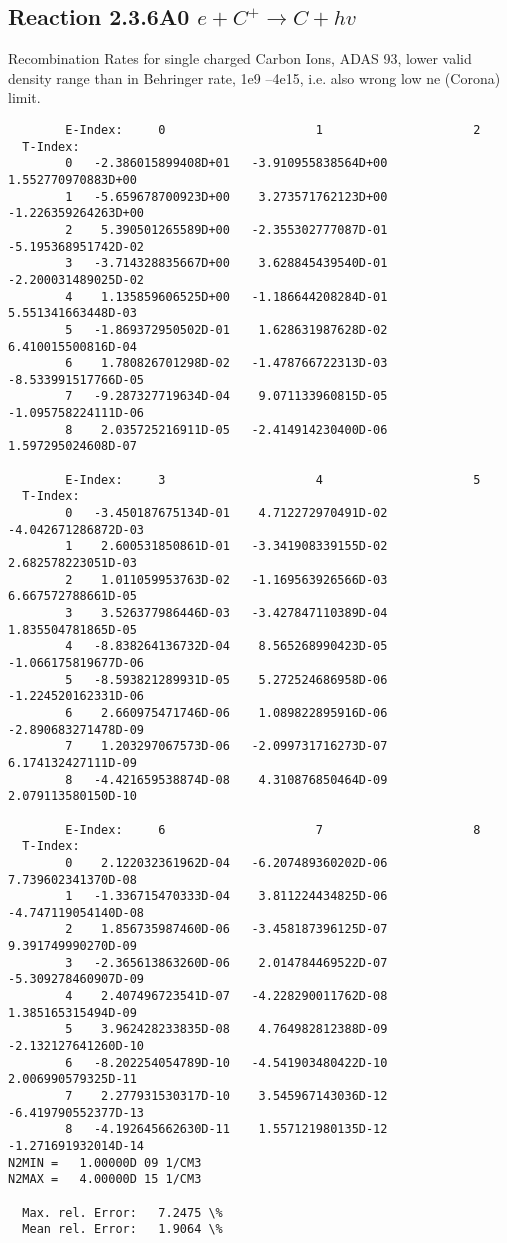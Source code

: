 \documentclass[12pt,dvipdfmx]{article}
\begin{document}
\subsection{
Reaction 2.3.6A0  $e + C^{+} \rightarrow C + hv$
}
 Recombination Rates for single
 charged Carbon Ions, ADAS 93,
 lower valid density range than in Behringer rate, 1e9 --4e15,
 i.e. also wrong low ne (Corona) limit.

\begin{small}\begin{verbatim}
        E-Index:     0                     1                     2
  T-Index:
        0   -2.386015899408D+01   -3.910955838564D+00    1.552770970883D+00
        1   -5.659678700923D+00    3.273571762123D+00   -1.226359264263D+00
        2    5.390501265589D+00   -2.355302777087D-01   -5.195368951742D-02
        3   -3.714328835667D+00    3.628845439540D-01   -2.200031489025D-02
        4    1.135859606525D+00   -1.186644208284D-01    5.551341663448D-03
        5   -1.869372950502D-01    1.628631987628D-02    6.410015500816D-04
        6    1.780826701298D-02   -1.478766722313D-03   -8.533991517766D-05
        7   -9.287327719634D-04    9.071133960815D-05   -1.095758224111D-06
        8    2.035725216911D-05   -2.414914230400D-06    1.597295024608D-07

        E-Index:     3                     4                     5
  T-Index:
        0   -3.450187675134D-01    4.712272970491D-02   -4.042671286872D-03
        1    2.600531850861D-01   -3.341908339155D-02    2.682578223051D-03
        2    1.011059953763D-02   -1.169563926566D-03    6.667572788661D-05
        3    3.526377986446D-03   -3.427847110389D-04    1.835504781865D-05
        4   -8.838264136732D-04    8.565268990423D-05   -1.066175819677D-06
        5   -8.593821289931D-05    5.272524686958D-06   -1.224520162331D-06
        6    2.660975471746D-06    1.089822895916D-06   -2.890683271478D-09
        7    1.203297067573D-06   -2.099731716273D-07    6.174132427111D-09
        8   -4.421659538874D-08    4.310876850464D-09    2.079113580150D-10

        E-Index:     6                     7                     8
  T-Index:
        0    2.122032361962D-04   -6.207489360202D-06    7.739602341370D-08
        1   -1.336715470333D-04    3.811224434825D-06   -4.747119054140D-08
        2    1.856735987460D-06   -3.458187396125D-07    9.391749990270D-09
        3   -2.365613863260D-06    2.014784469522D-07   -5.309278460907D-09
        4    2.407496723541D-07   -4.228290011762D-08    1.385165315494D-09
        5    3.962428233835D-08    4.764982812388D-09   -2.132127641260D-10
        6   -8.202254054789D-10   -4.541903480422D-10    2.006990579325D-11
        7    2.277931530317D-10    3.545967143036D-12   -6.419790552377D-13
        8   -4.192645662630D-11    1.557121980135D-12   -1.271691932014D-14
N2MIN =   1.00000D 09 1/CM3
N2MAX =   4.00000D 15 1/CM3

  Max. rel. Error:   7.2475 \%
  Mean rel. Error:   1.9064 \%


\end{verbatim}\end{small}
\end{document}
